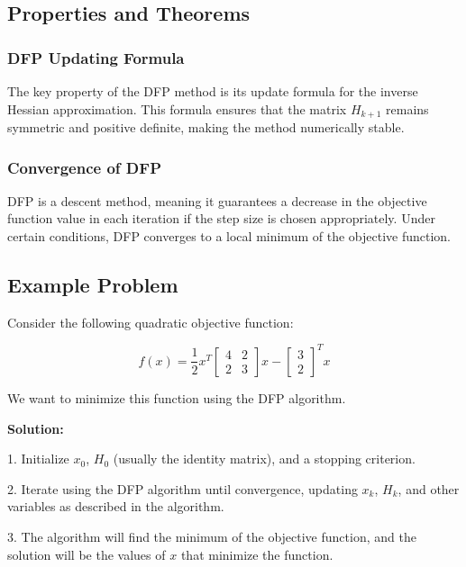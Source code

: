 \documentclass[a4paper]{article}
\begin{document}
\subsection{Properties and Theorems}

\subsubsection{DFP Updating Formula}

The key property of the DFP method is its update formula for the inverse Hessian approximation. This formula ensures that the matrix $H_{k+1}$ remains symmetric and positive definite, making the method numerically stable.

\subsubsection{Convergence of DFP}

DFP is a descent method, meaning it guarantees a decrease in the objective function value in each iteration if the step size is chosen appropriately. Under certain conditions, DFP converges to a local minimum of the objective function.

\subsection{Example Problem}

Consider the following quadratic objective function:

\[
f(x) = \frac{1}{2}x^T
\begin{bmatrix}
4 & 2 \\
2 & 3
\end{bmatrix}
x - \begin{bmatrix}
3 \\
2
\end{bmatrix}^Tx
\]

We want to minimize this function using the DFP algorithm.

\textbf{Solution:}

1. Initialize $x_0$, $H_0$ (usually the identity matrix), and a stopping criterion.

2. Iterate using the DFP algorithm until convergence, updating $x_k$, $H_k$, and other variables as described in the algorithm.

3. The algorithm will find the minimum of the objective function, and the solution will be the values of $x$ that minimize the function.
\end{document}
